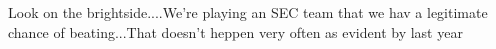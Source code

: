 \documentclass{article}
\begin{document}
Look on the brightside....We're playing an SEC team that we hav a legitimate chance of beating...That doesn't heppen very often as evident by last year
\end{document}
